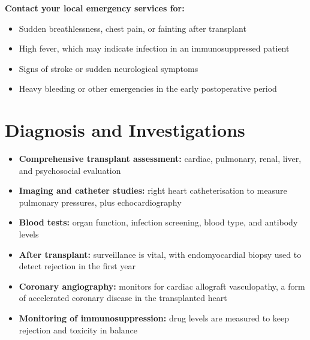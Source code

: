 \textbf{Contact your local emergency services for:}
\begin{itemize}
    \item Sudden breathlessness, chest pain, or fainting after transplant
    \item High fever, which may indicate infection in an immunosuppressed patient
    \item Signs of stroke or sudden neurological symptoms
    \item Heavy bleeding or other emergencies in the early postoperative period
\end{itemize}

\section*{Diagnosis and Investigations}
\begin{itemize}
    \item \textbf{Comprehensive transplant assessment:} cardiac, pulmonary, renal, liver, and psychosocial evaluation
    \item \textbf{Imaging and catheter studies:} right heart catheterisation to measure pulmonary pressures, plus echocardiography
    \item \textbf{Blood tests:} organ function, infection screening, blood type, and antibody levels
    \item \textbf{After transplant:} surveillance is vital, with endomyocardial biopsy used to detect rejection in the first year
    \item \textbf{Coronary angiography:} monitors for cardiac allograft vasculopathy, a form of accelerated coronary disease in the transplanted heart
    \item \textbf{Monitoring of immunosuppression:} drug levels are measured to keep rejection and toxicity in balance
\end{itemize}

